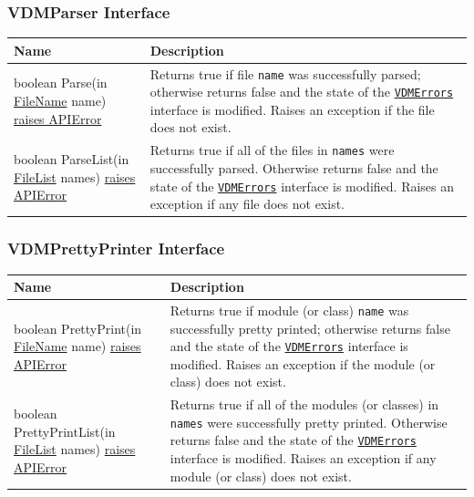 \documentclass[\pformat,12pt]{article}
\newcommand{\pbs}[1]{\let\temp=\\#1\let\\=\temp}
\newenvironment{interfacetable}{%
  \begin{longtable}{|>{\pbs\raggedright\ttfamily}p{6.6cm}%
                    |>{\pbs\raggedright}p{6.6cm}|} \hline
  \textrm{\bfseries Name} &  \textbf{Description} \\ \hline
  \endhead
  }{\end{longtable}}
\newcommand{\APIError}{\hyperlink{exception.APIError}{raises APIError}}
\newcommand{\FileName}{\hyperlink{type.FileName}{FileName}}
\newcommand{\FileList}{\hyperlink{type.FileList}{FileList}}
\newcommand{\VDMErrors}{\hyperlink{interface.VDMErrors}{VDMErrors}}
\begin{document}
\subsubsection{VDMParser Interface}
\mbox{}
\begin{interfacetable}
boolean Parse(in {\FileName} name) \APIError
  & Returns \textsf{true} if file \texttt{name} was successfully
    parsed; otherwise returns \textsf{false} and the state of the
    \texttt{\VDMErrors} interface is modified. Raises an exception if the
    file does not exist.
\\ \hline
boolean ParseList(in {\FileList} names) \APIError
  & Returns \textsf{true} if all of the files in \texttt{names} were
    successfully parsed. Otherwise returns \textsf{false} and the state of the
    \texttt{\VDMErrors} interface is modified. Raises an exception if any
    file does not exist. 
\\ \hline
\end{interfacetable}

\subsubsection{VDMPrettyPrinter Interface}
\mbox{}
\begin{interfacetable}
boolean PrettyPrint(in {\FileName} name) \APIError
  & Returns \textsf{true} if module (or class) \texttt{name} was
    successfully pretty printed; otherwise returns \textsf{false} and
    the state of the \texttt{\VDMErrors} interface is modified. Raises
    an exception if the module (or class) does not exist.
\\ \hline
boolean PrettyPrintList(in {\FileList} names) \APIError
  & Returns \textsf{true} if all of the modules (or classes) in
    \texttt{names} were successfully pretty printed. Otherwise returns
    \textsf{false} and the state of the \texttt{\VDMErrors} interface
    is modified. Raises an exception if any module (or class) does not
    exist.
\\ \hline
\end{interfacetable}
\end{document}
